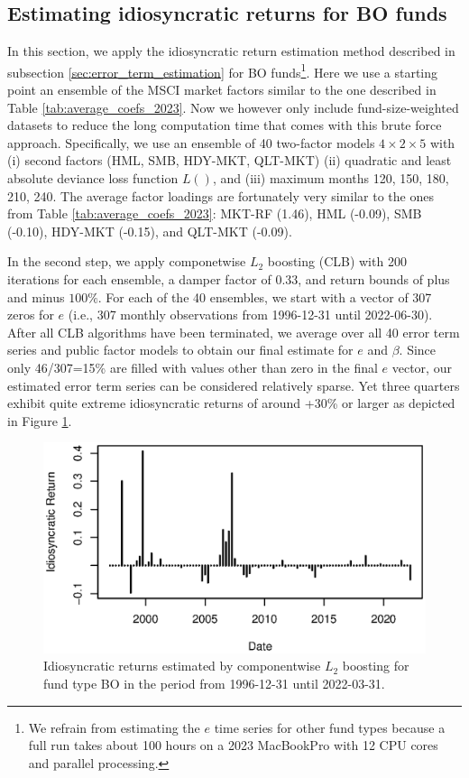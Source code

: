 \documentclass[12pt]{article}
\begin{document}
\subsection{Estimating idiosyncratic returns for BO funds}
\label{sec:idiosyncratic_BO}

In this section, we apply the idiosyncratic return estimation method described in subsection \ref{sec:error_term_estimation} for BO funds\footnote{We refrain from estimating the $e$ time series for other fund types because a full run takes about 100 hours on a 2023 MacBookPro with 12 CPU cores and parallel processing.}.
Here we use a starting point an ensemble of the MSCI market factors similar to the one described in Table \ref{tab:average_coefs_2023}.
Now we however only include fund-size-weighted datasets to reduce the long computation time that comes with this brute force approach.
Specifically, we use an ensemble of 40 two-factor models $4 \times 2 \times 5$  with (i) second factors (HML, SMB, HDY-MKT, QLT-MKT) (ii) quadratic and least absolute deviance loss function $L()$, and (iii) maximum months 120, 150, 180, 210, 240.
The average factor loadings are fortunately very similar to the ones from Table \ref{tab:average_coefs_2023}:  
MKT-RF (1.46), 
HML (-0.09), 
SMB (-0.10), 
HDY-MKT (-0.15), and 
QLT-MKT (-0.09).

In the second step, we apply componetwise $L_2$ boosting (CLB) with 200 iterations for each ensemble, a damper factor of 0.33, and return bounds of plus and minus $100\%$.
For each of the 40 ensembles, we start with a vector of 307 zeros for $e$  (i.e., 307 monthly observations from 1996-12-31 until 2022-06-30).
After all CLB algorithms have been terminated, we average over all 40 error term series and public factor models to obtain our final estimate for $e$ and $\beta$.
Since only 46/307=15\% are filled with values other than zero in the final $e$ vector, our estimated error term series can be considered relatively sparse.
Yet three quarters exhibit quite extreme idiosyncratic returns of around +30\% or larger as depicted in Figure \ref{fig:clb_idio}.

\begin{figure}[H]
	\centering
	\includegraphics{Figures/ErrorSeriesBO}
	\caption{Idiosyncratic returns estimated by componentwise $L_2$ boosting for fund type BO in the period from 1996-12-31 until 2022-03-31.}
	\label{fig:clb_idio}
\end{figure}
\end{document}
